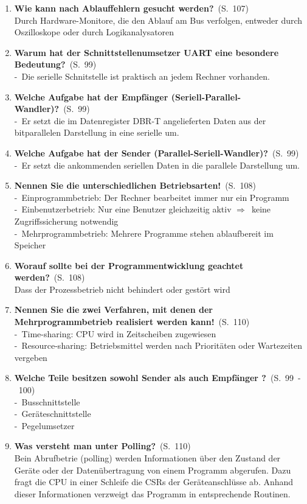 \documentclass[a4paper,12pt]{article}
\newcommand{\question}[3]{\pagebreak[3]\item {\textbf{#1?}}\ (S.\ #2)#3}
\newcommand{\statement}[3]{\pagebreak[3]\item {\textbf{#1!}}\ (S.\ #2)#3}
\newcommand{\catchword}[1]{\\-\ #1}
\newcommand{\normaltext}[1]{\\#1}
\newcommand{\resultol}[1]{ $\Rightarrow$\ #1}
\newcommand{\page}[1]{#1}
\newcommand{\pages}[2]{#1\ -\ #2}
\begin{document}
\begin{enumerate}
  \question{Wie kann nach Ablauffehlern gesucht werden}{\page{107}}
  {
    \normaltext{Durch Hardware-Monitore, die den Ablauf am Bus verfolgen, entweder durch
                Oszilloskope oder durch Logikanalysatoren}
  }

  \question{Warum hat der Schnittstellenumsetzer UART eine besondere Bedeutung}{\page{99}}
  {
    \catchword{Die serielle Schnitstelle ist praktisch an jedem Rechner vorhanden.}
  }

    \question{Welche Aufgabe hat der Empfänger (Seriell-Parallel-Wandler)}{\page{99}}
  {
    \catchword{Er setzt die im Datenregister DBR-T angelieferten Daten aus der bitparallelen 
    Darstellung in eine serielle um.}
  }

  \question{Welche Aufgabe hat der Sender (Parallel-Seriell-Wandler)}{\page{99}}
  {
    \catchword{Er setzt die ankommenden seriellen Daten in die parallele Darstellung um.}
  }

  \statement{Nennen Sie die unterschiedlichen Betriebsarten}{\page{108}}
  {
    \catchword{Einprogrammbetrieb: Der Rechner bearbeitet immer nur ein Programm}
    \catchword{Einbenutzerbetrieb: Nur eine Benutzer gleichzeitig aktiv
               \resultol{keine Zugriffssicherung notwendig}}
    \catchword{Mehrprogrammbetrieb: Mehrere Programme stehen ablaufbereit im Speicher}
  }

  \question{Worauf sollte bei der Programmentwicklung geachtet werden}{\page{108}}
  {
    \normaltext{Dass der Prozessbetrieb nicht behindert oder gestört wird}
  }

  \statement{Nennen Sie die zwei Verfahren, mit denen der Mehrprogrammbetrieb
             realisiert werden kann}{\page{110}}
  {
    \catchword{Time-sharing: CPU wird in Zeitscheiben zugewiesen}
    \catchword{Resource-sharing: Betriebsmittel werden nach Prioritäten oder Wartezeiten vergeben}
  }

  \question{Welche Teile besitzen sowohl Sender als auch Empfänger }{\pages{99}{100}}
  {
    \catchword{Busschnittstelle}
    \catchword{Geräteschnittstelle}
    \catchword{Pegelumsetzer}
  }

  \question{Was versteht man unter Polling}{\page{110}}
  {
    \normaltext{Bein Abrufbetrie (polling) werden Informationen über den Zustand der Geräte
                oder der Datenübertragung von einem Programm abgerufen. Dazu fragt die CPU in einer Schleife
                die CSRs der Geräteanschlüsse ab. Anhand dieser Informationen verzweigt das Programm in 
                entsprechende Routinen.}
  }


\end{enumerate}
\end{document}

